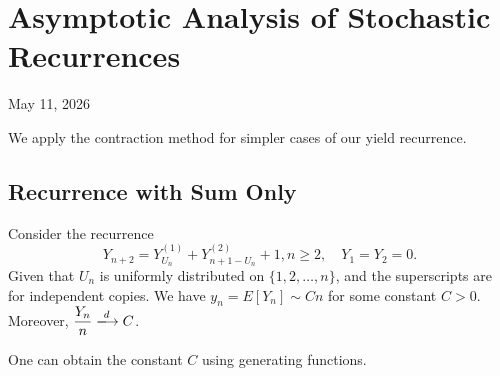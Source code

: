 \chapter{Asymptotic Analysis of Stochastic Recurrences}
\begin{center}
  May 11, 2026
  \vspace{0.5cm}
\end{center}


We apply the contraction method for simpler cases of our yield recurrence.

\section{Recurrence with Sum Only}

\begin{proposition}
  Consider the recurrence
  \begin{equation}
    Y_{n+2} = Y^{(1)}_{U_n} + Y^{(2)}_{n+1-U_n} + 1, n \ge 2, \quad Y_1 = Y_2 = 0.
  \end{equation}
  Given that $U_n$ is uniformly distributed on $\{1, 2, \ldots, n\}$, and the superscripts are for independent copies. We have $y_n = E[Y_n] \sim Cn$ for some constant $C > 0$. Moreover, $\dfrac{Y_n}{n}\xlongrightarrow{d} C$.
\end{proposition}

\begin{remark}
  One can obtain the constant $C$ using generating functions.
\end{remark}


